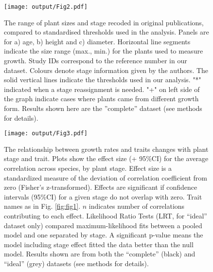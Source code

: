 \documentclass[a4paper,11pt]{article}
\begin{document}
\begin{figure}[h!]
\centering
\texttt{[image: output/Fig2.pdf]}
\caption{The range of plant sizes and stage recoded in original publications, compared to standardised thresholds used in the analysis. Panels are for
a) age, b) height and c) diameter. Horizontal line segments indicate the size range (max., min.) for the plants used to measure growth. Study IDs correspond to the reference number in our dataset. Colours denote stage information given by the authors. The solid vertical lines indicate the thresholds used in our analysis. "*" indicated when a stage reassignment is needed. "+" on left side of the graph indicate cases where plants came from different growth form. Results shown here are the ''complete'' dataset (see methods for details).}
\label{fig:fig2}
\end{figure}

\begin{figure}[h!]
\centering
\texttt{[image: output/Fig3.pdf]}
\caption{The relationship between growth rates and traits changes with plant stage and trait. Plots show the effect size (+ 95\%CI) for the average correlation across species, by plant stage. Effect size is a standardized measure of the deviation of correlation coefficient from zero (Fisher's z-transformed). Effects are significant if confidence intervals (95\%CI) for a given stage do not overlap with zero.  Trait names as in Fig. \ref{fig:fig1}. $n$ indicates number of correlations contributing to each effect. Likelihood Ratio Tests (LRT, for ``ideal'' dataset only) compared maximum-likelihood fits between a pooled model and one separated by stage. A significant p-value means the model including stage effect fitted the data better than the null model. Results shown are from both the ``complete'' (black)  and ``ideal'' (grey) datasets (see methods for details).}
\label{fig:fig3}
\end{figure}

\clearpage
\end{document}
